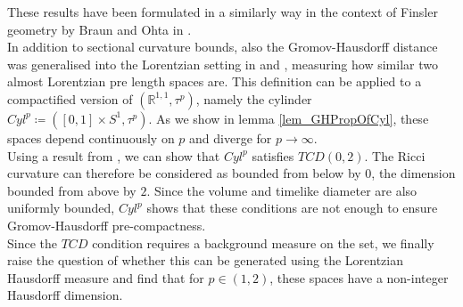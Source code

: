 \documentclass[11pt, a4paper]{article} %
\newcommand{\R}{\mathbb{R}} %
\theoremstyle{plain} %
\newcommand{\mDef}{\coloneqq }
\begin{document}
These results have been formulated in a similarly way in the context of Finsler geometry by Braun and Ohta in \cite{braun2023optimaltransporttimelikelower}.\\
In addition to sectional curvature bounds, also the Gromov-Hausdorff distance was generalised into the Lorentzian setting in \cite{muller2019lorentzianGromovHausdorfAndFiniteness} and \cite{minguzzi2022lorentzian}, measuring how similar two almost Lorentzian pre length spaces are. This definition can be applied to a compactified version of $(\R^{1,1},\tau^p)$, namely the cylinder $Cyl^p\mDef ([0,1]\times S^1,\tau^p)$. As we show in lemma \ref{lem_GHPropOfCyl}, these spaces depend continuously on $p$ and diverge for $p\to\infty$.\\
Using a result from \cite{beran2024nonlineardalembertcomparisontheorem}, we can show that $Cyl^p$ satisfies $TCD(0,2)$. The Ricci curvature can therefore be considered as bounded from below by $0$, the dimension bounded from above by $2$. Since the volume and timelike diameter are also uniformly bounded, $Cyl^p$ shows that these conditions are not enough to ensure Gromov-Hausdorff pre-compactness.\\
Since the $TCD$ condition requires a background measure on the set, we finally raise the question of whether this can be generated using the Lorentzian Hausdorff measure and find that for $p\in (1,2)$, these spaces have a non-integer Hausdorff dimension.
\end{document}
